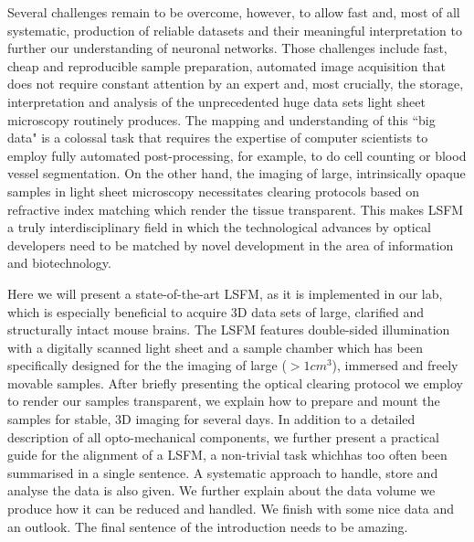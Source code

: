\documentclass[12pt]{spieman}  %
\begin{document}
Several challenges remain to be overcome, however, to allow fast and, most of all systematic, production of reliable datasets and their meaningful interpretation to further our understanding of neuronal networks. Those challenges include fast, cheap and reproducible sample preparation, automated image acquisition that does not require constant attention by an expert and, most crucially, the storage, interpretation and analysis of the unprecedented huge data sets light sheet microscopy routinely produces. The mapping and understanding of this ``big data" is a colossal task that requires the expertise of computer scientists to employ fully automated post-processing, for example, to do cell counting or blood vessel segmentation. On the other hand, the imaging of large, intrinsically opaque samples in light sheet microscopy necessitates clearing protocols based on refractive index matching which render the tissue transparent. This makes LSFM a truly interdisciplinary field in which the technological advances by optical developers need to be matched by novel development in the area of information and biotechnology.

Here we will present a state-of-the-art LSFM, as it is implemented in our lab, which is especially beneficial to acquire 3D data sets of large, clarified and structurally intact mouse brains. The LSFM features double-sided illumination with a digitally scanned light sheet and a sample chamber which has been specifically designed for the the imaging of large ($> 1cm^3$), immersed and freely movable samples. After briefly presenting the optical clearing protocol we employ to render our samples transparent, we explain how to prepare and mount the samples for stable, 3D imaging for several days. In addition to a detailed description of all opto-mechanical components, we further present a practical guide for the alignment of a LSFM, a non-trivial task whichhas too often been summarised in a single sentence. A systematic approach to handle, store and analyse the data is also given. We further explain about the data volume we produce how it can be reduced and handled. We finish with some nice data and an outlook.  The final sentence of the introduction needs to be amazing. 
\end{document}
